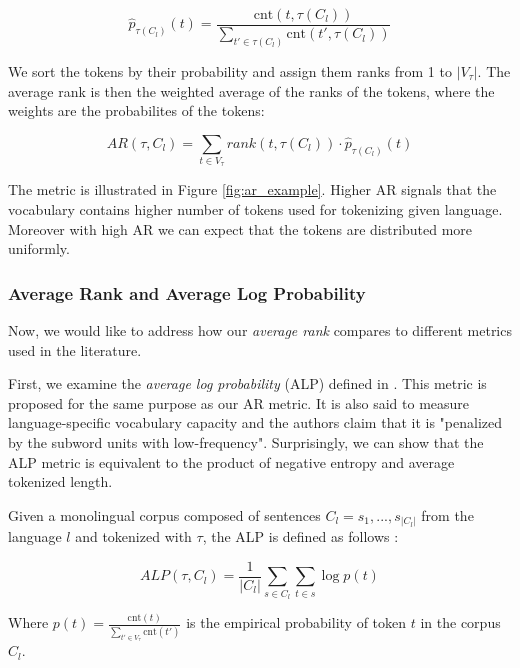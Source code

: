 \begin{equation}
    \hat{p}_{\tau(C_l)}(t) = \frac{\mathrm{cnt}(t, \tau(C_l))}{\sum_{t' \in \tau(C_l)} \mathrm{cnt}(t', \tau(C_l))}
\end{equation}

We sort the tokens by their probability and assign them ranks from 1 to $|V_\tau|$. The average rank is then the weighted average of the ranks of the tokens, where the weights are the probabilites of the tokens:

\begin{equation}
    AR(\tau, C_l) = \sum_{t \in V_\tau} rank(t, \tau(C_l)) \cdot \hat{p}_{\tau(C_l)}(t)
\end{equation}

The metric is illustrated in Figure \ref{fig:ar_example}. Higher AR signals that the vocabulary contains higher number of tokens used for tokenizing given language. Moreover with high AR we can expect that the tokens are distributed more uniformly.

\subsubsection{Average Rank and Average Log Probability}
Now, we would like to address how our \textit{average rank} compares to different metrics used in the literature. 

First, we examine the \textit{average log probability} (ALP) defined in \citet{zheng_allocating_2021}. This metric is proposed for the same purpose as our AR metric. It is also said to measure language-specific vocabulary capacity and the authors claim that it is "penalized by the subword units with low-frequency". Surprisingly, we can show that the ALP metric is equivalent to the product of negative entropy and average tokenized length.

Given a monolingual corpus composed of sentences $C_l = {s_1, ..., s_{|C_l|}}$ from the language $l$ and tokenized with $\tau$, the ALP is defined as follows \cite{zheng_allocating_2021}:

\begin{equation}
\label{eq:alp}
    ALP(\tau, C_l) = \frac{1}{|C_l|} \sum_{s \in C_l} \sum_{t \in s} \log p(t)
\end{equation}

Where $p(t) = \frac{\mathrm{cnt}(t)}{\sum_{t' \in V_\tau} \mathrm{cnt}(t')}$ is the empirical probability of token $t$ in the corpus $C_l$. 


